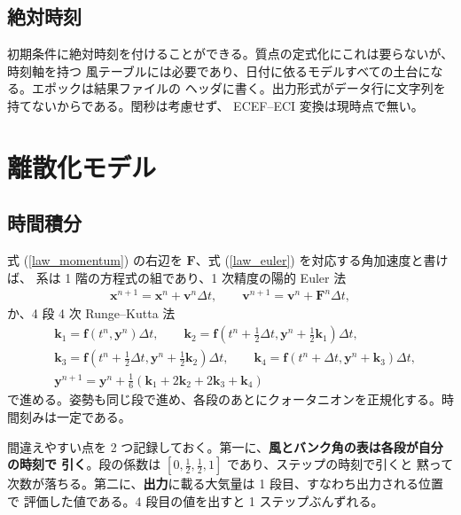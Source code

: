 \documentclass[11pt,a4paper,dvipdfmx]{jsarticle}
\newcommand{\bx}{{\boldsymbol x}}
\newcommand{\bv}{{\boldsymbol v}}
\newcommand{\bF}{{\boldsymbol F}}
\begin{document}
\subsection{絶対時刻}

初期条件に絶対時刻を付けることができる。質点の定式化にこれは要らないが、時刻軸を持つ
風テーブルには必要であり、日付に依るモデルすべての土台になる。エポックは結果ファイルの
ヘッダに書く。出力形式がデータ行に文字列を持てないからである。閏秒は考慮せず、
ECEF--ECI 変換は現時点で無い。

\section{離散化モデル}

\subsection{時間積分}

式 (\ref{law_momentum}) の右辺を $\bF$、式 (\ref{law_euler}) を対応する角加速度と書けば、
系は 1 階の方程式の組であり、1 次精度の陽的 Euler 法
%
\begin{align}
	\bx^{n+1} = \bx^{n} + \bv^{n} \Delta t , \qquad
	\bv^{n+1} = \bv^{n} + \bF^{n} \Delta t ,
	\label{euler}
\end{align}
%
か、4 段 4 次 Runge--Kutta 法
%
\begin{align}
&	{\boldsymbol k}_1 = {\boldsymbol f} \left( t^n, {\boldsymbol y}^n \right) \Delta t , \qquad
	{\boldsymbol k}_2 = {\boldsymbol f} \left( t^n + \tfrac{1}{2}\Delta t, {\boldsymbol y}^n + \tfrac{1}{2}{\boldsymbol k}_1 \right) \Delta t , \nonumber \\
&	{\boldsymbol k}_3 = {\boldsymbol f} \left( t^n + \tfrac{1}{2}\Delta t, {\boldsymbol y}^n + \tfrac{1}{2}{\boldsymbol k}_2 \right) \Delta t , \qquad
	{\boldsymbol k}_4 = {\boldsymbol f} \left( t^n + \Delta t, {\boldsymbol y}^n + {\boldsymbol k}_3 \right) \Delta t , \\
&	{\boldsymbol y}^{n+1} = {\boldsymbol y}^{n} + \tfrac{1}{6} \left( {\boldsymbol k}_1 + 2 {\boldsymbol k}_2 + 2 {\boldsymbol k}_3 + {\boldsymbol k}_4 \right) \nonumber
\end{align}
%
で進める。姿勢も同じ段で進め、各段のあとにクォータニオンを正規化する。時間刻みは一定である。

間違えやすい点を 2 つ記録しておく。第一に、\textbf{風とバンク角の表は各段が自分の時刻で
引く}。段の係数は $[0, \frac{1}{2}, \frac{1}{2}, 1]$ であり、ステップの時刻で引くと
黙って次数が落ちる。第二に、\textbf{出力}に載る大気量は 1 段目、すなわち出力される位置で
評価した値である。4 段目の値を出すと 1 ステップぶんずれる。
\end{document}
